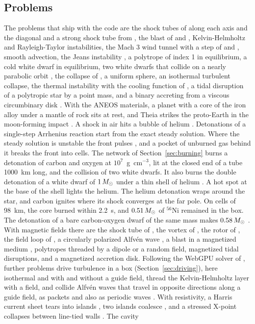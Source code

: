 \documentclass[twocolumn]{aastex701}
\begin{document}
\subsection{Problems}
\label{sec:problems}

The problems that ship with the code are the shock tubes of \citet{Sod1978} along each axis and the diagonal and a strong shock tube from \citet{Toro2009}, the blast of \citet{Taylor1950} and \citet{Sedov1959}, Kelvin-Helmholtz and Rayleigh-Taylor instabilities, the Mach 3 wind tunnel with a step of \citet{Emery1968} and \citet{Woodward1984}, smooth advection, the Jeans instability \citep{Jeans1902}, a polytrope of index 1 in equilibrium, a cold white dwarf in equilibrium, two white dwarfs that collide on a nearly parabolic orbit \citep{Rosswog2009, Raskin2009}, the collapse of \citet{Evrard1988}, a uniform sphere, an isothermal turbulent collapse, the thermal instability \citep{Field1965} with the cooling function of \citet{Koyama2002}, a tidal disruption of a polytropic star by a point mass, and a binary accreting from a viscous circumbinary disk \citep{Artymowicz1994, MacFadyen2008}. With the ANEOS materials, a planet with a core of the iron alloy under a mantle of rock sits at rest, and Theia strikes the proto-Earth in the moon-forming impact \citep{Canup2004}. A shock in air hits a bubble of helium \citep{Haas1987, QuirkKarni1996}. Detonations of a single-step Arrhenius reaction start from the exact steady solution. Where the steady solution is unstable the front pulses \citep{Fickett1966}, and a pocket of unburned gas behind it breaks the front into cells. The network of Section~\ref{sec:burning} burns a detonation of carbon and oxygen at $10^7$~g~cm$^{-3}$, lit at the closed end of a tube 1000~km long, and the collision of two white dwarfs. It also burns the double detonation of a white dwarf of $1\,M_\odot$ under a thin shell of helium \citep{Livne1990, Fink2010}. A hot spot at the base of the shell lights the helium. The helium detonation wraps around the star, and carbon ignites where its shock converges at the far pole. On cells of 98~km, the core burned within 2.2~s, and $0.51\,M_\odot$ of $^{56}$Ni remained in the box. The detonation of a bare carbon-oxygen dwarf of the same mass makes $0.58\,M_\odot$ \citep{Shen2018}. With magnetic fields there are the shock tube of \citet{Brio1988}, the vortex of \citet{Orszag1979}, the rotor of \citet{Balsara1999}, the field loop of \citet{GardinerStone2005}, a circularly polarized Alfv\'en wave \citep{Toth2000}, a blast in a magnetized medium \citep{Stone2008}, polytropes threaded by a dipole or a random field, magnetized tidal disruptions, and a magnetized accretion disk. Following the WebGPU solver of \citet{Mallet2026}, further problems drive turbulence in a box (Section~\ref{sec:driving}), here isothermal and with and without a guide field, thread the Kelvin-Helmholtz layer with a field, and collide Alfv\'en waves that travel in opposite directions along a guide field, as packets \citep{Verniero2018} and also as periodic waves \citep{HowesNielson2013}. With resistivity, a Harris current sheet tears into islands \citep{Furth1963}, two islands coalesce \citep{FinnKaw1977}, and a stressed X-point collapses between line-tied walls \citep{Thurgood2018}. The cavity 
\end{document}
